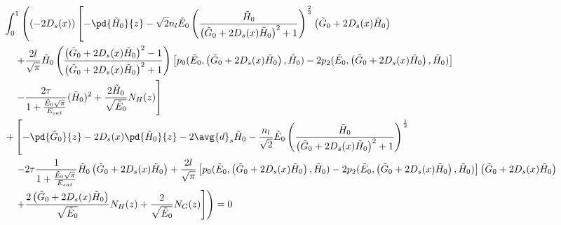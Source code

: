 \begin{equation}
\begin{split}
&\int_{0}^{1} \left( (- 2 D_s(x)) \left[-\pd{\tilde{H}_0}{z} - \sqrt{2}n_{l}\tilde{E}_0 \left(\frac{\tilde{H}_0}{\left(\tilde{G}_0+ 2 D_s(x) \tilde{H}_0\right)^2+1}\right)^{\frac{2}{3}} \left(\tilde{G}_0+ 2 D_s(x) \tilde{H}_0\right) \right. \right.\\
&\left. \left. \quad+ \frac{2l}{\sqrt{\pi}}\tilde{H}_0 \left(\frac{\left(\tilde{G}_0+ 2 D_s(x) \tilde{H}_0\right)^2-1}{\left(\tilde{G}_0+ 2 D_s(x) \tilde{H}_0\right)^2+1}\right) \left[p_0(\tilde{E}_0,\left(\tilde{G}_0 + 2 D_s(x) \tilde{H}_0\right),\tilde{H}_0) - 2p_2(\tilde{E}_0,\left(\tilde{G}_0+ 2 D_s(x) \tilde{H}_0\right),\tilde{H}_0)\right] \right. \right.\\
&\left.\left. \quad - \frac{2\tau}{1+\frac{\tilde{E}_0 \sqrt{\pi}}{E_{sat}}} (\tilde{H}_0)^2  + \frac{2\tilde{H}_0}{\sqrt{\tilde{E}_0}} N_H(z)\right] \right.\\
&\left. + \left[-\pd{\tilde{G}_0}{z} - 2 D_s(x) \pd{\tilde{H}_0}{z} - 2 \avg{d}_s \tilde{H}_0 - \frac{n_{l}}{\sqrt{2}}\tilde{E}_0 \left(\frac{\tilde{H}_0}{\left(\tilde{G}_0+ 2 D_s(x) \tilde{H}_0\right)^2+1}\right)^{\frac{1}{2}} \right. \right.\\
&\left.\left. \quad- 2\tau\frac{1}{1+\frac{\tilde{E}_0 \sqrt{\pi}}{E_{sat}}}\tilde{H}_0 \left(\tilde{G}_0+ 2 D_s(x) \tilde{H}_0\right) + \frac{2l}{\sqrt{\pi}}\left[p_0(\tilde{E}_0,\left(\tilde{G}_0+ 2 D_s(x) \tilde{H}_0\right),\tilde{H}_0) - 2p_2(\tilde{E}_0,\left(\tilde{G}_0+ 2 D_s(x) \tilde{H}_0\right),\tilde{H}_0)\right]\left(\tilde{G}_0+ 2 D_s(x) \tilde{H}_0\right) \right.\right.\\
&\left.\left. \quad+ \frac{2\left(\tilde{G}_0+ 2 D_s(x) \tilde{H}_0\right)}{\sqrt{\tilde{E}_0}} N_H(z) + \frac{2}{\sqrt{\tilde{E}_0}} N_G(z) \right]\right) = 0\\
\end{split}
\end{equation}
